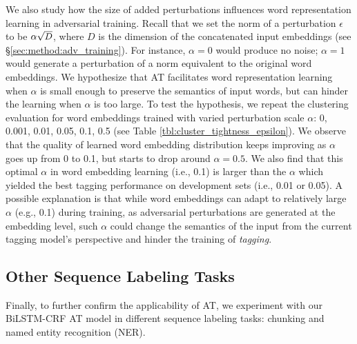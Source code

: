 \documentclass[11pt,a4paper]{article}
\newcommand\scaleeq[3]{\mbox{\scalebox{#1}[#2]{$#3$}}}
\begin{document}
We also study how the size of added perturbations influences word representation learning in adversarial training.
Recall that we set the norm of a perturbation $\epsilon$ %
to be $\alpha \scaleeq{0.95}{0.95}{\sqrt{D}}$, where $D$ is the dimension of the concatenated input embeddings (see \S \ref{sec:method:adv_training}).
For instance, $\alpha \!=\! 0$ 
would produce no noise; $\alpha \!=\! 1$ would generate a perturbation of a norm equivalent to the original word embeddings.
We hypothesize that AT facilitates word representation learning when $\alpha$ is small enough to preserve the semantics of input words, but can hinder the learning when $\alpha$ is too large.
To test the hypothesis, we repeat the clustering evaluation for 
word embeddings trained with varied perturbation scale $\alpha$: 0, 0.001, 0.01, 0.05, 0.1, 0.5 (see Table \ref{tbl:cluster_tightness_epsilon}).
We observe that the quality of 
learned word embedding distribution keeps improving as $\alpha$ goes up from 0 to 0.1, but starts to drop around $\alpha \!=\! 0.5$.
We also find that this optimal $\alpha$ in word embedding learning (i.e., 0.1)
is larger than the $\alpha$ which yielded the best tagging performance on development sets (i.e., 0.01 or 0.05).
A possible explanation is that
while word embeddings
can adapt to relatively large $\alpha$ (e.g., 0.1) during training, as adversarial perturbations are generated at the embedding level, such $\alpha$ could change the semantics of the input from the current tagging model's perspective and hinder the training of {\it tagging}.





\subsection{Other Sequence Labeling Tasks}
\label{sec:additional_task}

Finally, to further confirm the applicability of AT, we experiment with our BiLSTM-CRF AT model in different sequence labeling tasks: chunking and named entity recognition (NER).\vspace{0.5mm}
\end{document}
